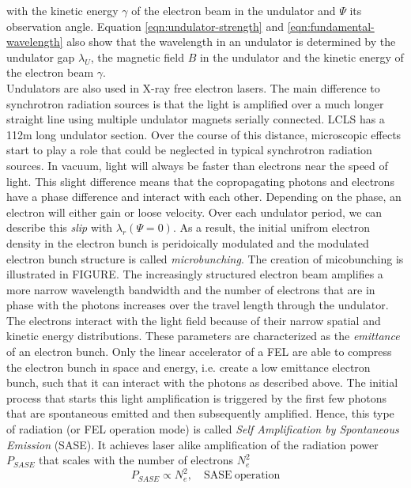 with the kinetic energy $\gamma$ of the electron beam in the undulator and $\Psi$ its observation angle. Equation \ref{eqn:undulator-strength} and \ref{eqn:fundamental-wavelength} also show that the wavelength in an undulator is determined by the undulator gap $\lambda_{U}$, the magnetic field $B$ in the undulator and the kinetic energy of the electron beam $\gamma$.\\
Undulators are also used in X-ray free electron lasers. The main difference to synchrotron radiation sources is that the light is amplified over a much longer straight line using multiple undulator magnets serially connected. LCLS has a 112m long undulator section. Over the course of this distance, microscopic effects start to play a role that could be neglected in typical synchrotron radiation sources. In vacuum, light will always be faster than electrons near the speed of light. This slight difference means that the copropagating photons and electrons have a phase difference and interact with each other. Depending on the phase, an electron will either gain or loose velocity. Over each undulator period, we can describe this \textit{slip} with $\lambda_{r}(\Psi = 0)$. As a result, the initial unifrom electron density in the electron bunch is peridoically modulated and the modulated electron bunch structure is called \textit{microbunching}. The creation of micobunching is illustrated in FIGURE. The increasingly structured electron beam amplifies a more narrow wavelength bandwidth and the number of electrons that are in phase with the photons increases over the travel length through the undulator. The electrons interact with the light field because of their narrow spatial and kinetic energy distributions. These parameters are characterized as the \textit{emittance} of an electron bunch. Only the linear accelerator of a FEL are able to compress the electron bunch in space and energy, i.e. create a low emittance electron bunch, such that it can interact with the photons as described above. The initial process that starts this light amplification is triggered by the first few photons that are spontaneous emitted and then subsequently amplified. Hence, this type of radiation (or FEL operation mode) is called \textit{Self Amplification by Spontaneous Emission} (SASE). It achieves laser alike amplification of the radiation power $P_{SASE}$ that scales with the number of electrons $N_{e}^{2}$
\begin{equation}
P_{SASE} \propto N_{e}^{2},\quad \mathrm{SASE\ operation}
\end{equation}
